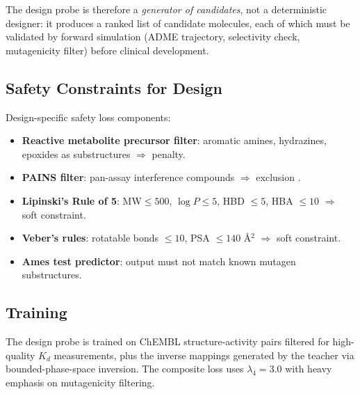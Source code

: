 \documentclass[11pt,twocolumn,a4paper]{article}
\theoremstyle{definition}
\theoremstyle{remark}
\begin{document}
The design probe is therefore a \emph{generator of candidates}, not a deterministic designer: it produces a ranked list of candidate molecules, each of which must be validated by forward simulation (ADME trajectory, selectivity check, mutagenicity filter) before clinical development.

\subsection{Safety Constraints for Design}

Design-specific safety loss components:
\begin{itemize}[nosep,leftmargin=*]
\item \textbf{Reactive metabolite precursor filter}: aromatic amines, hydrazines, epoxides as substructures $\Rightarrow$ penalty.
\item \textbf{PAINS filter}: pan-assay interference compounds $\Rightarrow$ exclusion \citep{baell2010}.
\item \textbf{Lipinski's Rule of 5}: MW$\leq 500$, $\log P \leq 5$, HBD $\leq 5$, HBA $\leq 10$ $\Rightarrow$ soft constraint.
\item \textbf{Veber's rules}: rotatable bonds $\leq 10$, PSA $\leq 140$ \AA$^2$ $\Rightarrow$ soft constraint.
\item \textbf{Ames test predictor}: output must not match known mutagen substructures.
\end{itemize}

\subsection{Training}

The design probe is trained on ChEMBL structure-activity pairs filtered for high-quality $K_d$ measurements, plus the inverse mappings generated by the teacher via bounded-phase-space inversion. The composite loss uses $\lambda_4 = 3.0$ with heavy emphasis on mutagenicity filtering.
\end{document}
